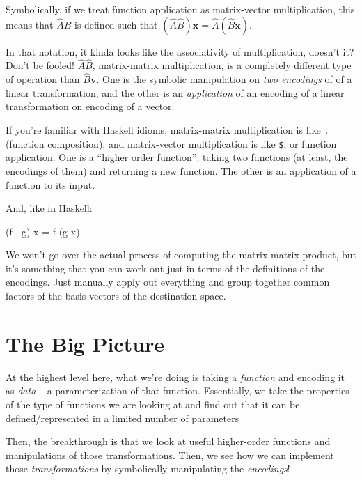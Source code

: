 \documentclass[]{article}
\newenvironment{Shaded}{}{}
\newcommand{\NormalTok}[1]{#1}
\newcommand{\OperatorTok}[1]{\textcolor[rgb]{0.40,0.40,0.40}{#1}}
\newcommand{\OtherTok}[1]{\textcolor[rgb]{0.00,0.44,0.13}{#1}}
\begin{document}
Symbolically, if we treat function application as matrix-vector multiplication,
this means that \(\hat{A}\hat{B}\) is defined such that
\((\hat{A}\hat{B})\mathbf{x} = \hat{A}(\hat{B}\mathbf{x})\).

In that notation, it kinda looks like the associativity of multiplication,
doesn't it? Don't be fooled! \(\hat{A} \hat{B}\), matrix-matrix multiplication,
is a completely different type of operation than \(\hat{B}\mathbf{v}\). One is
the symbolic manipulation on \emph{two encodings} of of a linear transformation,
and the other is an \emph{application} of an encoding of a linear transformation
on encoding of a vector.

If you're familiar with Haskell idioms, matrix-matrix multiplication is like
\texttt{.} (function composition), and matrix-vector multiplication is like
\texttt{\$}, or function application. One is a ``higher order function'': taking
two functions (at least, the encodings of them) and returning a new function.
The other is an application of a function to its input.

And, like in Haskell:

\begin{Shaded}
\begin{Highlighting}[]
\NormalTok{(f }\OperatorTok{.}\NormalTok{ g) x }\OtherTok{=}\NormalTok{ f (g x)}
\end{Highlighting}
\end{Shaded}

We won't go over the actual process of computing the matrix-matrix product, but
it's something that you can work out just in terms of the definitions of the
encodings. Just manually apply out everything and group together common factors
of the basis vectors of the destination space.

\section{The Big Picture}\label{the-big-picture}

At the highest level here, what we're doing is taking a \emph{function} and
encoding it as \emph{data} -- a parameterization of that function. Essentially,
we take the properties of the type of functions we are looking at and find out
that it can be defined/represented in a limited number of parameters

Then, the breakthrough is that we look at useful higher-order functions and
manipulations of those transformations. Then, we see how we can implement those
\emph{transformations} by symbolically manipulating the \emph{encodings}!
\end{document}
